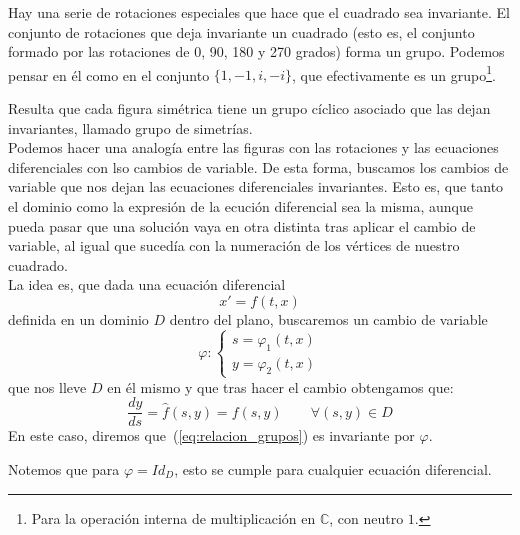 Hay una serie de rotaciones especiales que hace que el cuadrado sea invariante. El conjunto de rotaciones que deja invariante un cuadrado (esto es, el conjunto formado por las rotaciones de 0, 90, 180 y 270 grados) forma un grupo. Podemos pensar en él como en el conjunto $\{1, -1, i, -i\}$, que efectivamente es un grupo\footnote{Para la operación interna de multiplicación en $\mathbb{C}$, con neutro $1$.}.

Resulta que cada figura simétrica tiene un grupo cíclico asociado que las dejan invariantes, llamado grupo de simetrías.\\

Podemos hacer una analogía entre las figuras con las rotaciones y las ecuaciones diferenciales con lso cambios de variable. De esta forma, buscamos los cambios de variable que nos dejan las ecuaciones diferenciales invariantes. Esto es, que tanto el dominio como la expresión de la ecución diferencial sea la misma, aunque pueda pasar que una solución vaya en otra distinta tras aplicar el cambio de variable, al igual que sucedía con la numeración de los vértices de nuestro cuadrado.\\

La idea es, que dada una ecuación diferencial
\begin{equation}\label{eq:relacion_grupos}
    x' = f(t,x)
\end{equation}
definida en un dominio $D$ dentro del plano, buscaremos un cambio de variable 
\begin{equation*}
    \varphi: \left\{\begin{array}{rl}
        s = \varphi_1(t,x) \\
        y = \varphi_2(t,x) 
    \end{array}\right.
\end{equation*}
que nos lleve $D$ en él mismo y que tras hacer el cambio obtengamos que:
\begin{equation*}
    \dfrac{dy}{ds} = \hat{f}(s,y) = f(s,y) \qquad \forall (s,y)\in D
\end{equation*}
En este caso, diremos que~(\ref{eq:relacion_grupos}) es invariante por $\varphi$.

Notemos que para $\varphi = Id_D$, esto se cumple para cualquier ecuación diferencial.

